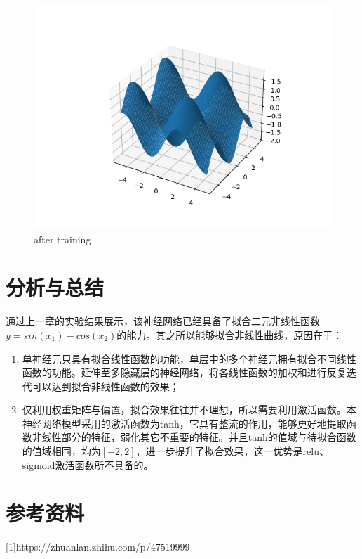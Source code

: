 \documentclass{article}
\begin{document}
\begin{figure}[H]
	\centering
	\includegraphics[scale=0.6]{3d2.png}
	\caption{after training}
\end{figure}

\section{分析与总结}
通过上一章的实验结果展示，该神经网络已经具备了拟合二元非线性函数$ y=sin(x_1)-cos(x_2) $的能力。其之所以能够拟合非线性曲线，原因在于：
\begin{enumerate}[1)]
	\item 单神经元只具有拟合线性函数的功能，单层中的多个神经元拥有拟合不同线性函数的功能。延伸至多隐藏层的神经网络，将各线性函数的加权和进行反复迭代可以达到拟合非线性函数的效果；
	\item 仅利用权重矩阵与偏置，拟合效果往往并不理想，所以需要利用激活函数。本神经网络模型采用的激活函数为tanh，它具有整流的作用，能够更好地提取函数非线性部分的特征，弱化其它不重要的特征。并且tanh的值域与待拟合函数的值域相同，均为$ [-2, 2] $，进一步提升了拟合效果，这一优势是relu、sigmoid激活函数所不具备的。
\end{enumerate}

\section{参考资料}
[1]https://zhuanlan.zhihu.com/p/47519999
\end{document}
